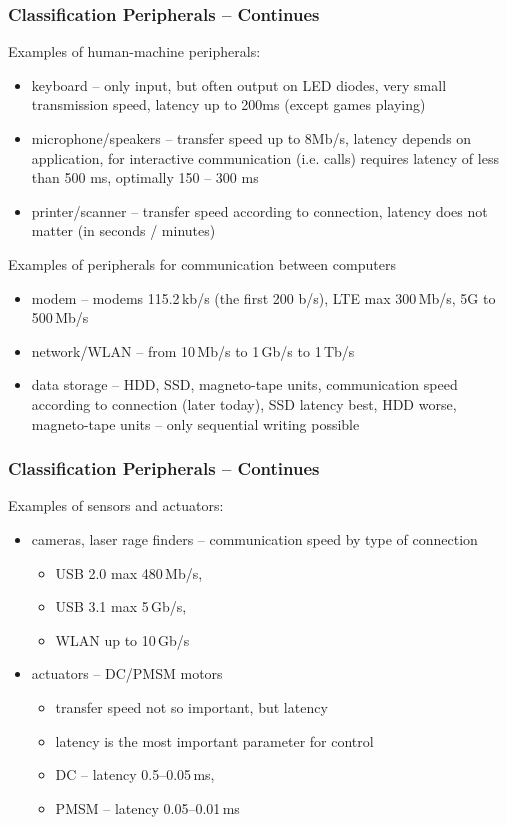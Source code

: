 \documentclass{beamer}
\begin{document}
\begin{frame}
\frametitle{Classification Peripherals -- Continues}

Examples of human-machine peripherals:
\begin{itemize}
\item keyboard -- only input, but often output on LED diodes, very small transmission speed, latency up to 200ms (except games playing)
\item  microphone/speakers -- transfer speed up to 8Mb/s, latency depends on application, for interactive communication (i.e. calls) requires latency of less than 500 ms, optimally 150 -- 300 ms
\item printer/scanner -- transfer speed according to connection, latency does not matter (in seconds / minutes)
\end{itemize}

Examples of peripherals for communication between computers
\begin{itemize}
\item modem -- modems 115.2\,kb/s (the first 200 b/s), LTE max 300\,Mb/s, 5G to 500\,Mb/s
\item network/WLAN -- from 10\,Mb/s to 1\,Gb/s to 1\,Tb/s
\item data storage -- HDD, SSD, magneto-tape units, communication speed according to connection (later today), SSD latency best, HDD worse, magneto-tape units -- only sequential writing possible
\end{itemize}

\end{frame}


\begin{frame}
\frametitle{Classification Peripherals -- Continues}

Examples of sensors and actuators:
\begin{itemize}
\item cameras, laser rage finders -- communication speed by type of connection
\begin{itemize}
\item USB 2.0 max 480\,Mb/s,
\item USB 3.1 max 5\,Gb/s,
\item WLAN up to 10\,Gb/s
\end{itemize}
\item actuators -- DC/PMSM motors
\begin{itemize}
\item transfer speed not so important, but latency
\item latency is the most important parameter for control
\item DC -- latency 0.5--0.05\,ms,
\item PMSM -- latency 0.05--0.01\,ms
\end{itemize}
\end{itemize}

\end{frame}
\end{document}
